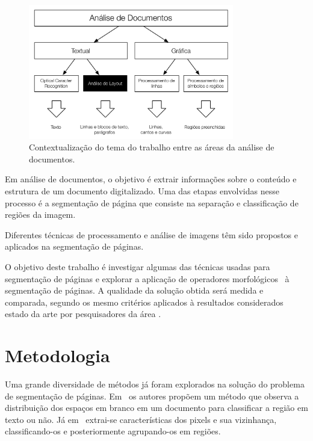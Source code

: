 \documentclass[times, 10pt,twocolumn]{article}
\begin{document}
\begin{figure}[htb!]
\begin{center}
\includegraphics[width=0.8\textwidth]{assets/document_processing_areas_hierarquies.pdf}
\end{center}
\caption{Contextualização do tema do trabalho entre as áreas da análise de documentos.}
\label{fig:context1}
\end{figure}

Em análise de documentos, o objetivo é extrair informações sobre o
conteúdo e estrutura de um documento digitalizado. Uma das etapas
envolvidas nesse processo é a segmentação de página que consiste na separação
e classificação de regiões da imagem.

Diferentes técnicas de processamento e análise de imagens têm sido
propostos e aplicados na segmentação de páginas.

O objetivo deste trabalho é investigar algumas das técnicas usadas
para segmentação de páginas e explorar a aplicação de operadores
morfológicos~\cite{Serra:1983:IAM:1098652} à segmentação de páginas. A qualidade da solução
obtida será medida e comparada, segundo os mesmo critérios aplicados à
resultados considerados estado da arte por pesquisadores da área
\cite{10.1109/ICDAR.2007.207}.


\section{Metodologia}

Uma grande diversidade de métodos já foram explorados na solução do
problema de segmentação de
páginas. Em~\cite{Antonacopoulos95representationand} os autores
propõem um método
que observa a distribuição dos espaços em branco em um documento para
classificar a região em texto ou não. Já
em~\cite{Moll07documentcontent} extrai-se características dos pixels e
sua vizinhança, classificando-os e posteriormente agrupando-os em regiões.
\end{document}

